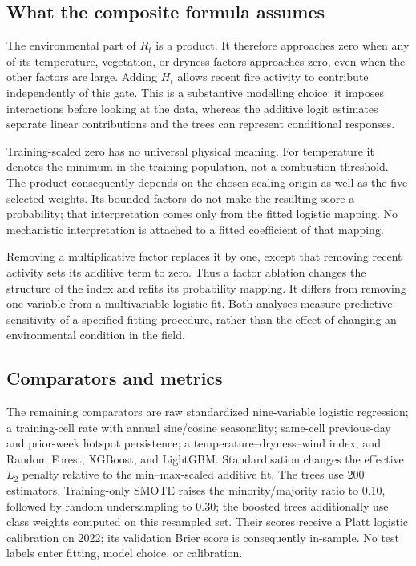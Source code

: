 \documentclass[conference]{IEEEtran}
\begin{document}
\subsection{What the composite formula assumes}
The environmental part of $R_t$ is a product. It therefore approaches zero when any of its temperature, vegetation, or dryness factors approaches zero, even when the other factors are large. Adding $H_t$ allows recent fire activity to contribute independently of this gate. This is a substantive modelling choice: it imposes interactions before looking at the data, whereas the additive logit estimates separate linear contributions and the trees can represent conditional responses.

Training-scaled zero has no universal physical meaning. For temperature it denotes the minimum in the training population, not a combustion threshold. The product consequently depends on the chosen scaling origin as well as the five selected weights. Its bounded factors do not make the resulting score a probability; that interpretation comes only from the fitted logistic mapping. No mechanistic interpretation is attached to a fitted coefficient of that mapping.

Removing a multiplicative factor replaces it by one, except that removing recent activity sets its additive term to zero. Thus a factor ablation changes the structure of the index and refits its probability mapping. It differs from removing one variable from a multivariable logistic fit. Both analyses measure predictive sensitivity of a specified fitting procedure, rather than the effect of changing an environmental condition in the field.

\subsection{Comparators and metrics}
The remaining comparators are raw standardized nine-variable logistic regression; a training-cell rate with annual sine/cosine seasonality; same-cell previous-day and prior-week hotspot persistence; a temperature--dryness--wind index; and Random Forest, XGBoost, and LightGBM. Standardisation changes the effective $L_2$ penalty relative to the min--max-scaled additive fit. The trees use 200 estimators. Training-only SMOTE raises the minority/majority ratio to 0.10, followed by random undersampling to 0.30; the boosted trees additionally use class weights computed on this resampled set. Their scores receive a Platt logistic calibration on 2022; its validation Brier score is consequently in-sample. No test labels enter fitting, model choice, or calibration.
\end{document}
